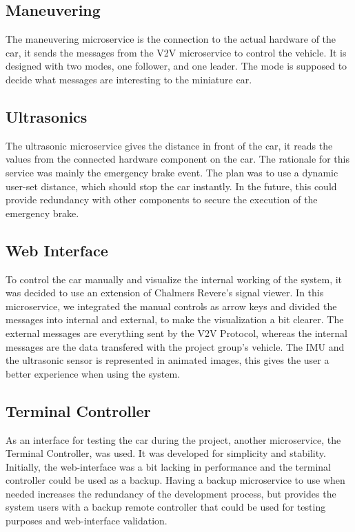\documentclass[12pt]{article}
\begin{document}
\subsection{Maneuvering}
The maneuvering microservice is the connection to the actual hardware of the car, it sends the messages from the V2V microservice to control the vehicle. It is designed with two modes, one follower, and one leader. The mode is supposed to decide what messages are interesting to the miniature car.
\subsection{Ultrasonics}
The ultrasonic microservice gives the distance in front of the car, it reads the values from the connected hardware component on the car. The rationale for this service was mainly the emergency brake event. The plan was to use a dynamic user-set distance, which should stop the car instantly. In the future, this could provide redundancy with other components to secure the execution of the emergency brake.
\subsection{Web Interface}
To control the car manually and visualize the internal working of the system, it was decided to use an extension of Chalmers Revere's signal viewer\cite{signal viewer}. In this microservice, we integrated the manual controls as arrow keys and divided the messages into internal and external, to make the visualization a bit clearer. The external messages are everything sent by the V2V Protocol, whereas the internal messages are the data transfered with the project group's vehicle. The IMU and the ultrasonic sensor is represented in animated images, this gives the user a better experience when using the system.  
\subsection{Terminal Controller}
As an interface for testing the car during the project, another microservice, the Terminal Controller, was used. It was developed for simplicity and stability. Initially, the web-interface was a bit lacking in performance and the terminal controller could be used as a backup. Having a backup microservice to use when needed increases the redundancy of the development process, but provides the system users with a backup remote controller that could be used for testing purposes and web-interface validation. 
\end{document}

